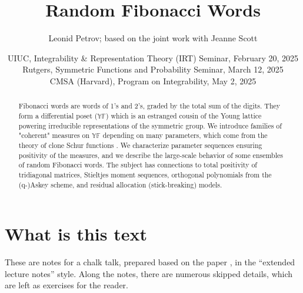 \documentclass[letterpaper,11pt,oneside,reqno]{article}
\numberwithin{equation}{section}
\theoremstyle{definition}
\begin{document}
\title{Random Fibonacci Words}


\author{Leonid Petrov; based on the joint work with Jeanne Scott \cite{PetrovScott2024Fibonacci}}

\date{UIUC, Integrability \& Representation Theory (IRT) Seminar, February 20, 2025\\
Rutgers, 
Symmetric Functions and Probability Seminar, March 12, 2025\\
CMSA (Harvard), Program on Integrability, May 2, 2025}


\maketitle

\begin{abstract}
	Fibonacci words are words of 1's and 2's, graded by the total sum of the digits. They form a differential poset ($\mathbb{YF}$) which is an estranged cousin of the Young lattice powering irreducible representations of the symmetric group. We introduce families of "coherent" measures on $\mathbb{YF}$ depending on many parameters, which come from the theory of clone Schur functions \cite{okada1994algebras}. We characterize parameter sequences ensuring positivity of the measures, and we describe the large-scale behavior of some ensembles of random Fibonacci words. The subject has connections to total positivity of tridiagonal matrices, Stieltjes moment sequences, orthogonal polynomials from the (q-)Askey scheme, and residual allocation (stick-breaking) models.
\end{abstract}

\section*{What is this text}

These are notes for a chalk talk, prepared based on the paper
\cite{PetrovScott2024Fibonacci}, in the ``extended lecture notes''
style.
Along the notes, there are numerous skipped details,
which are left as exercises for the reader.

\setcounter{tocdepth}{1}
\tableofcontents
\setcounter{tocdepth}{3}
\newpage
\end{document}
